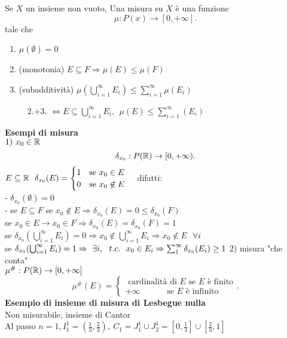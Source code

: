 \documentclass{article}
\begin{document}
  \begin{defi}
  	Se $X$ un insieme non vuoto, Una misura su $X $ è una funzione 
	\[
		\mu: P(x) \rightarrow [0,+\infty]
	.\] 
	tale che
	\begin{enumerate}
		\item $\mu(\emptyset) = 0$
		\item (monotonia) $E \subseteq F \Rightarrow \mu(E) \leq \mu(F) $
		\item (subadditività) $\mu( \bigcup^{\infty}_{i=1}E_i)\leq \sum^{\infty}_{i=1}\mu(E_i)$ 
		\item[\text{} \ \ 2.+3.] $ \Leftrightarrow E\subseteq \bigcup^{\infty}_{i=1} E_i, \ \ \mu(E)\leq \sum^{\infty}_{i=1}(E_i)$
	\end{enumerate}
  \end{defi}
\textbf{Esempi di misura}\\
$1)\ x_0 \in\mathbb{R}$
\[
	\delta_{x_0}: P(\mathbb{R}) \rightarrow [0,+\infty)
.\] 
$E\subseteq \mathbb{R} \ \ \delta_{x_0}(E) = \begin{cases}
	1\ \ \ \text {se } x_0\in E\\
	0 \ \ \ \text{se }  x_0\not\in E
\end{cases}$
difatti:\\
- $\delta_{x_0}(\emptyset) = 0$\\
- se  $E\subseteq F$ se  $x_0\not\in E \Rightarrow \delta_{x_0}(E) = 0 \leq \delta_{x_0}(F)$ \\
se $x_0\in E \rightarrow x_0 \in F \Rightarrow \delta_{x_0}(E)=\delta_{x_0}(F) = 1 $\\
se $\delta_{x_0}( \bigcup^{\infty}_{i=1}E_i) = 0 \Rightarrow x_0\not\in \bigcup^{\infty}_{i=1}E_i \Rightarrow x_0\not\in E \ \ \ \forall i$ \\
se $\delta_{x_0}( \bigcup^{\infty}_{i=1}E_i) = 1 \Rightarrow \ \exists i, \ \ t.c. \ \ x_0\in E_i \Rightarrow \sum^{\infty}_{1}\delta_{x_0}(E_i)\geq 1\\$
2) misura "che conta"\\
$\mu^\# : P(\mathbb{R}) \rightarrow[0,+\infty] $\\
\[
 \mu^\# (E) = \begin{cases}
	 \text{ cardinalità di } E \text { se } E \text{ è finito}\\
	 +\infty \ \ \ \ \ \ \ \ \ \ \ \ \  \text{ se } E \text { è infinito}
 \end{cases}
.\] 
\textbf{Esempio di insieme di misura di Lesbegue nulla}\\
Non misurabile, insieme di Cantor\\
Al passo $n=1, I_1^1 = (\frac 13, \frac 23), \ C_1= J^1_1 \cup J^1_2 = [0,\frac 13] \cup [\frac 23, 1]$\\
\end{document}
